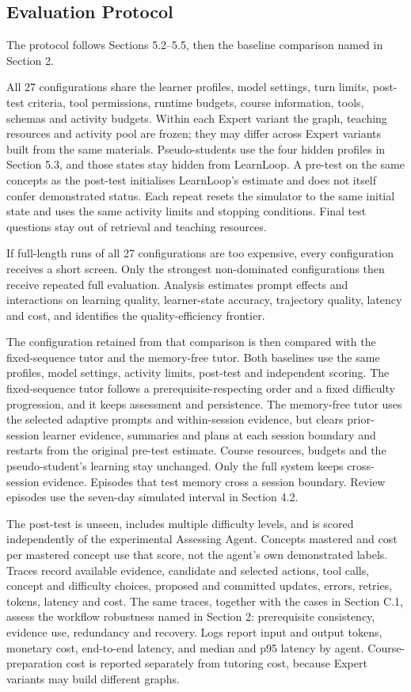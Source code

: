\documentclass{article}
\begin{document}
\subsection{Evaluation Protocol}

The protocol follows Sections 5.2--5.5, then the baseline comparison named in Section 2.

All 27 configurations share the learner profiles, model settings, turn limits, post-test criteria, tool permissions, runtime budgets, course information, tools, schemas and activity budgets. Within each Expert variant the graph, teaching resources and activity pool are frozen; they may differ across Expert variants built from the same materials. Pseudo-students use the four hidden profiles in Section 5.3, and those states stay hidden from LearnLoop. A pre-test on the same concepts as the post-test initialises LearnLoop's estimate and does not itself confer demonstrated status. Each repeat resets the simulator to the same initial state and uses the same activity limits and stopping conditions. Final test questions stay out of retrieval and teaching resources.

If full-length runs of all 27 configurations are too expensive, every configuration receives a short screen. Only the strongest non-dominated configurations then receive repeated full evaluation. Analysis estimates prompt effects and interactions on learning quality, learner-state accuracy, trajectory quality, latency and cost, and identifies the quality-efficiency frontier.

The configuration retained from that comparison is then compared with the fixed-sequence tutor and the memory-free tutor. Both baselines use the same profiles, model settings, activity limits, post-test and independent scoring. The fixed-sequence tutor follows a prerequisite-respecting order and a fixed difficulty progression, and it keeps assessment and persistence. The memory-free tutor uses the selected adaptive prompts and within-session evidence, but clears prior-session learner evidence, summaries and plans at each session boundary and restarts from the original pre-test estimate. Course resources, budgets and the pseudo-student's learning stay unchanged. Only the full system keeps cross-session evidence. Episodes that test memory cross a session boundary. Review episodes use the seven-day simulated interval in Section 4.2.

The post-test is unseen, includes multiple difficulty levels, and is scored independently of the experimental Assessing Agent. Concepts mastered and cost per mastered concept use that score, not the agent's own demonstrated labels. Traces record available evidence, candidate and selected actions, tool calls, concept and difficulty choices, proposed and committed updates, errors, retries, tokens, latency and cost. The same traces, together with the cases in Section C.1, assess the workflow robustness named in Section 2: prerequisite consistency, evidence use, redundancy and recovery. Logs report input and output tokens, monetary cost, end-to-end latency, and median and p95 latency by agent. Course-preparation cost is reported separately from tutoring cost, because Expert variants may build different graphs.
\end{document}
